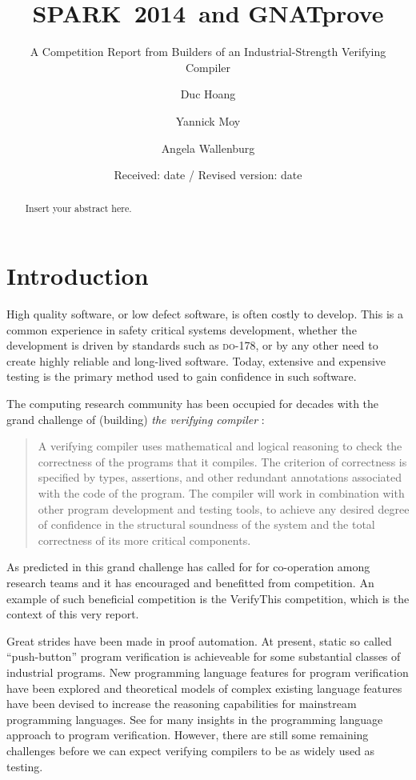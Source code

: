 \documentclass[sttt,draft]{svjour}
\newcommand{\DO}{\textsc{do-178}}
\newcommand{\gnatprove}{GNATprove\xspace}
\newcommand{\newspark}{SPARK~2014\xspace}
\begin{document}
%
\title{\newspark\ and \gnatprove}
\subtitle{A Competition Report from Builders of an Industrial-Strength Verifying Compiler}
\author{Duc Hoang \and Yannick Moy \and Angela Wallenburg
}                     %

\date{Received: date / Revised version: date}
%
\maketitle
%
\begin{abstract}
Insert your abstract here.
\end{abstract}
%
\section{Introduction}
\label{intro}
High quality software, or low defect software, is often costly to
develop. This is a common experience in safety critical systems
development, whether the development is driven by standards such as
\DO, or by any other need to create highly reliable and long-lived
software. Today, extensive and expensive testing is the primary method
used to gain confidence in such software.

The computing research community has been occupied for decades with
the grand challenge of (building) \emph{the verifying compiler}
\cite{Hoare03theverifying}:
%
\begin{quote} A verifying compiler uses mathematical and logical reasoning
  to check the correctness of the programs that it compiles. The
  criterion of correctness is specified by types, assertions, and
  other redundant annotations associated with the code of the
  program. The compiler will work in combination with other program
  development and testing tools, to achieve any desired degree of
  confidence in the structural soundness of the system and the total
  correctness of its more critical components.
\end{quote}

As predicted in \cite{Hoare03theverifying} this grand challenge has
called for for co-operation among research teams and it has encouraged
and benefitted from competition. An example of such beneficial
competition is the VerifyThis competition, which is the context of
this very report.

Great strides have been made in proof automation. At present, static
so called ``push-button'' program verification is achieveable for some
substantial classes of industrial programs. New programming language
features for program verification have been explored and theoretical
models of complex existing language features have been devised to
increase the reasoning capabilities for mainstream programming
languages. See \cite{HatcliffLLMP12} for many insights in the
programming language approach to program verification. However, there
are still some remaining challenges before we can expect verifying
compilers to be as widely used as testing.
\end{document}

